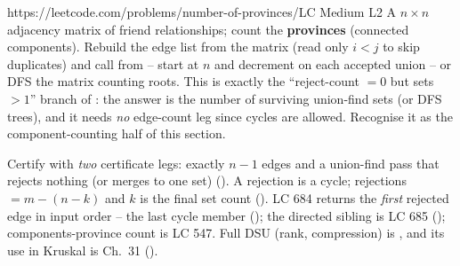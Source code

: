\begin{practiceset}
    {https://leetcode.com/problems/number-of-provinces/}{LC Medium L2}
    {A $n\times n$ adjacency matrix  of friend relationships; count the
    \textbf{provinces} (connected components). Rebuild the edge list from the matrix (read only
    $i<j$ to skip duplicates) and call  from  -- start at $n$
    and decrement on each accepted union -- or DFS the matrix counting roots. This is exactly the
    ``reject-count $=0$ but sets${}>1$'' branch of : the answer is the number of
    surviving union-find sets (or DFS trees), and it needs \emph{no} edge-count leg since cycles are
    allowed. Recognise it as the component-counting half of this section.}
\end{practiceset}

\begin{recallbox}
Certify with \emph{two} certificate legs: exactly $n-1$ edges and a union-find pass that rejects
nothing (or merges to one set) (). A rejection is a cycle; rejections${}=m-(n-k)$
and $k$ is the final set count (). LC 684 returns the \emph{first} rejected edge in
input order -- the last cycle member (); the directed sibling is LC 685
(); components-province count is LC 547. Full DSU (rank, compression) is
, and its use in Kruskal is Ch.~31 ().
\end{recallbox}

